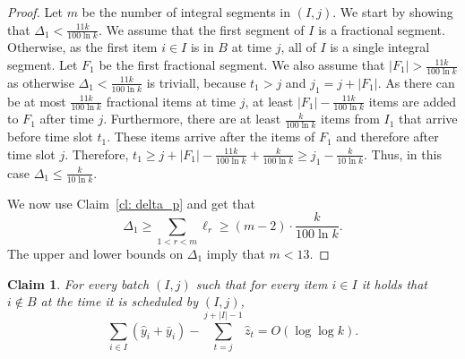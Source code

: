 \documentclass[12pt]{article}
\newtheorem{claim}[theorem]{Claim}
\begin{document}
\begin{proof}
Let $m$ be the number of integral segments in $(I,j)$.
 We start by showing that  $\Delta_1<\frac{11k}{100\ln k}$.
We assume that the first segment of $I$ is a fractional segment.
Otherwise, as  the first item $i\in I$ is in $B$ at time $j$,
all of $I$ is a single integral segment. 
Let $F_1$ be the first fractional segment. We also assume that 
$|F_1|> \frac{11k}{100\ln k}$ as otherwise  $\Delta_1<\frac{11k}{100\ln k}$ is triviall, 
because $t_1 >j$ and $j_1=j+|F_1|$. 
As there can be at most $\frac {11k}{100\ln k}$ fractional
items at time $j$, at least $|F_1|-\frac {11k}{100\ln k}$ items
are added to $F_1$ after time $j$. Furthermore, there are at least 
$\frac {k}{100\ln k}$ items from $I_1$ that arrive before time
slot $t_1$. These items arrive after the items of $F_1$ and therefore
after time slot $j$.
Therefore, $t_1\ge j+|F_1|-\frac {11k}{100\ln k} +
\frac {k}{100\ln k} \ge j_1 -\frac {k}{10\ln k}$.
Thus, in this case $\Delta_1 \le \frac {k}{10\ln k}$.

We now use Claim~\ref{cl: delta_p} and get that 
$$
\Delta_1\ge\sum_{1<r< m}{\ell_r}\ge (m-2)\cdot \frac{k}{100\ln k}.
$$
The upper and lower bounds on $\Delta_1$ imply that $m <13$.
\end{proof}

\begin{claim}\label{cl: batch after alg}
For every batch $(I,j)$ such that for every item $i\in I$ it holds
that $i\not\in B$ at the time it is scheduled by $(I,j)$,
$$
\sum_{i\in I}(\hat{y}_i+\bar{y}_i)-\sum_{t=j}^{j+|I|-1}\hat{z}_t =
O(\log \log k).
$$
\end{claim}
\end{document}
